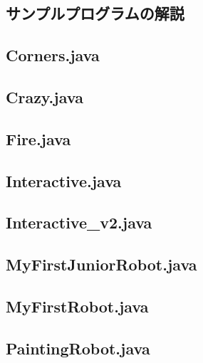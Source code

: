 \documentclass[12pt]{jarticle} %
\begin{document}
\begin{flushleft}

\section{サンプルプログラムの解説}
\subsection{Corners.java}


\newpage

\subsection{Crazy.java}


\newpage

\subsection{Fire.java}


\newpage

\subsection{Interactive.java}


\newpage

\subsection{Interactive\_v2.java}

\newpage

\subsection{MyFirstJuniorRobot.java}

\newpage

\subsection{MyFirstRobot.java}

\newpage

\subsection{PaintingRobot.java}

\newpage


\end{flushleft}
\end{document}
